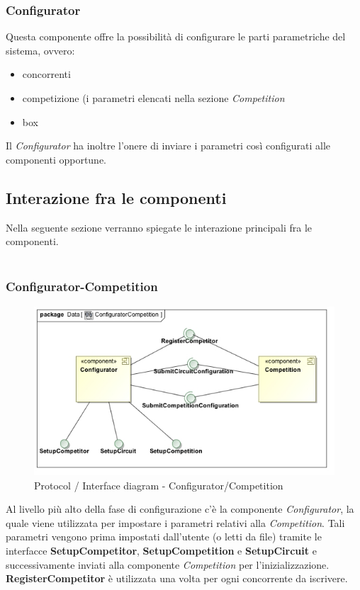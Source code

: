 \subsubsection{Configurator}
Questa componente offre la possibilit\`{a} di configurare le parti parametriche del sistema, ovvero:
\begin{itemize}
	\item concorrenti 
	\item competizione (i parametri elencati nella sezione \emph{Competition}
	\item box
\end{itemize}
Il \emph{Configurator} ha inoltre l'onere di inviare i parametri cos\`{i} configurati alle componenti opportune.

\subsection{Interazione fra le componenti}
Nella seguente sezione verranno spiegate le interazione principali fra le componenti.\\\\
\subsubsection{Configurator-Competition}
\begin{center}
\begin{figure}[h!]
	\includegraphics[scale=0.55]{img/InteractionDiagram/Implementation_Diagram__ConfiguratorCompetition.jpg}
\caption{Protocol / Interface diagram - Configurator/Competition}
\end{figure}
\end{center}
Al livello pi\`{u} alto della fase di configurazione c'\`{e} la componente \emph{Configurator}, la quale viene utilizzata per impostare i parametri
relativi alla \emph{Competition}. Tali parametri vengono prima impostati dall'utente (o letti da file) tramite le interfacce \textbf{SetupCompetitor},
\textbf{SetupCompetition} e \textbf{SetupCircuit} e successivamente inviati alla componente \emph{Competition} per l'inizializzazione.\\
\textbf{RegisterCompetitor} \`{e} utilizzata una volta per ogni concorrente da iscrivere.
\clearpage
